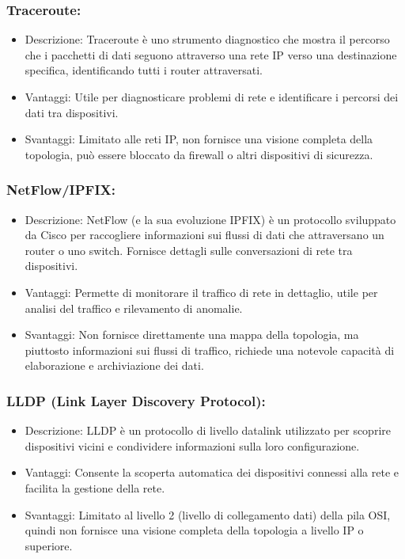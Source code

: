 \documentclass[target=bach,aauheader=,style=]{thud}
\begin{document}
\subsubsection{Traceroute:}
    \begin{itemize}
      \item Descrizione: Traceroute è uno strumento diagnostico che mostra il percorso che i pacchetti di dati seguono attraverso una rete IP verso una destinazione specifica, identificando tutti i router attraversati.
      \item Vantaggi: Utile per diagnosticare problemi di rete e identificare i percorsi dei dati tra dispositivi.
      \item Svantaggi: Limitato alle reti IP, non fornisce una visione completa della topologia, può essere bloccato da firewall o altri dispositivi di sicurezza.
    \end{itemize}

\subsubsection{NetFlow/IPFIX:}
    \begin{itemize}
      \item Descrizione: NetFlow (e la sua evoluzione IPFIX) è un protocollo sviluppato da Cisco per raccogliere informazioni sui flussi di dati che attraversano un router o uno switch. Fornisce dettagli sulle conversazioni di rete tra dispositivi.
      \item Vantaggi: Permette di monitorare il traffico di rete in dettaglio, utile per analisi del traffico e rilevamento di anomalie.
      \item Svantaggi: Non fornisce direttamente una mappa della topologia, ma piuttosto informazioni sui flussi di traffico, richiede una notevole capacità di elaborazione e archiviazione dei dati.
    \end{itemize}

\subsubsection{LLDP (Link Layer Discovery Protocol):}
    \begin{itemize}
      \item Descrizione: LLDP è un protocollo di livello datalink utilizzato per scoprire dispositivi vicini e condividere informazioni sulla loro configurazione.
      \item Vantaggi: Consente la scoperta automatica dei dispositivi connessi alla rete e facilita la gestione della rete.
      \item Svantaggi: Limitato al livello 2 (livello di collegamento dati) della pila OSI, quindi non fornisce una visione completa della topologia a livello IP o superiore.
    \end{itemize}
\end{document}
